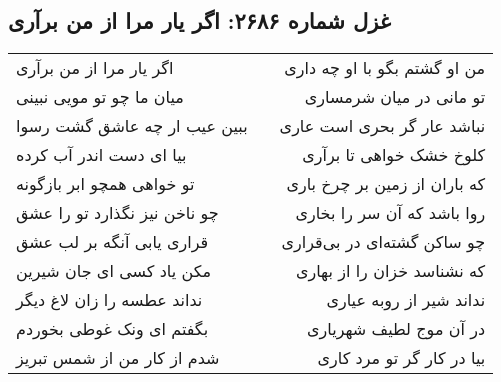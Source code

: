 \begin{center}
\section*{غزل شماره ۲۶۸۶: اگر یار مرا از من برآری}
\label{sec:2686}
\begin{longtable}{l p{0.5cm} r}
اگر یار مرا از من برآری
&&
من او گشتم بگو با او چه داری
\\
میان ما چو تو مویی نبینی
&&
تو مانی در میان شرمساری
\\
ببین عیب ار چه عاشق گشت رسوا
&&
نباشد عار گر بحری است عاری
\\
بیا ای دست اندر آب کرده
&&
کلوخ خشک خواهی تا برآری
\\
تو خواهی همچو ابر بازگونه
&&
که باران از زمین بر چرخ باری
\\
چو ناخن نیز نگذارد تو را عشق
&&
روا باشد که آن سر را بخاری
\\
قراری یابی آنگه بر لب عشق
&&
چو ساکن گشته‌ای در بی‌قراری
\\
مکن یاد کسی ای جان شیرین
&&
که نشناسد خزان را از بهاری
\\
نداند عطسه را زان لاغ دیگر
&&
نداند شیر از روبه عیاری
\\
بگفتم ای ونک غوطی بخوردم
&&
در آن موج لطیف شهریاری
\\
شدم از کار من از شمس تبریز
&&
بیا در کار گر تو مرد کاری
\\
\end{longtable}
\end{center}
